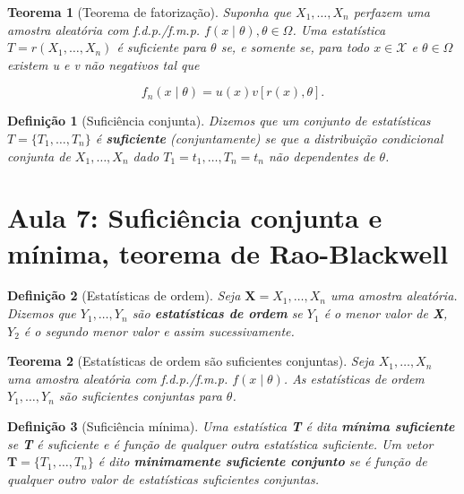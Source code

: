 \documentclass{article}
\newtheorem{theorem}{Teorema}
\newtheorem{definition}{Definição}
\begin{document}
\begin{theorem}[Teorema de fatorização]\label{teo:fatorizacao}
Suponha que $X_1, \ldots, X_n$ perfazem uma amostra aleatória com f.d.p./f.m.p. $f(x \mid \theta), \theta \in \Omega$. Uma estatística $T = r(X_1, \ldots, X_n)$ é suficiente para $\theta$ se, e somente se, para todo $x \in \mathcal{X}$ e $\theta \in \Omega$ existem u e v não negativos tal que

\begin{equation}
    f_n(x \mid \theta) = u(x) v[r(x), \theta].
\end{equation}
\end{theorem}

\begin{definition}[Suficiência conjunta]
Dizemos que um conjunto de estatísticas $T = \{T_1, \ldots, T_n\}$ é \textbf{suficiente} (conjuntamente) se que a distribuição condicional conjunta de $X_1, \ldots, X_n$ dado $T_1 = t_1, \ldots, T_n = t_n$ não dependentes de $\theta$.
\end{definition}

\section*{Aula 7: Suficiência conjunta e mínima, teorema de Rao-Blackwell}
\label{s7}
\begin{definition}[Estatísticas de ordem]
Seja $\textbf{X} = X_1, \ldots, X_n$ uma amostra aleatória. Dizemos que $Y_1, \ldots, Y_n$ são \textbf{estatísticas de ordem} se $Y_1$ é o menor valor de \textbf{X}, $Y_2$ é o segundo menor valor e assim sucessivamente.
\end{definition}

\begin{theorem}[Estatísticas de ordem são suficientes conjuntas]
Seja $X_1, \ldots, X_n$ uma amostra aleatória com f.d.p./f.m.p. $f(x \mid \theta)$. As estatísticas de ordem $Y_1, \ldots, Y_n$ são suficientes conjuntas para $\theta$.
\end{theorem}

\begin{definition}[Suficiência mínima]
Uma estatística \textbf{T} é dita \textbf{mínima suficiente} se \textbf{T} é suficiente e é função de qualquer outra estatística suficiente. Um vetor $\textbf{T} = \{ T_1, \ldots, T_n \}$ é dito \textbf{minimamente suficiente conjunto} se é função de qualquer outro valor de estatísticas suficientes conjuntas.
\end{definition}
\end{document}
